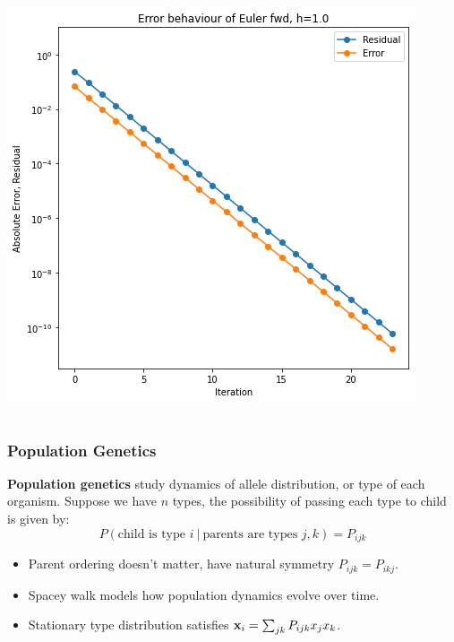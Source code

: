 \documentclass{beamer}
\begin{document}
\begin{frame}
\begin{columns}
    \begin{column}{0.5\linewidth}
      \includegraphics[width=\linewidth]{images/euler.png}
    \end{column}
  \end{columns}
\end{frame}


\begin{frame}
  \frametitle{Population Genetics}
  \textbf{Population genetics} study dynamics of allele distribution, or type of each organism.  Suppose we have $n$ types, the possibility of passing each type to child is given by:
  \[ P\left(\text{child is type } i \:|\: \text{parents are types } j, k\right) = P_{ijk} \]
  \begin{itemize}
  	\item Parent ordering doesn't matter, have natural symmetry $P_{ijk}=P_{ikj}$.
  	\item Spacey walk models how population dynamics evolve over time.
  	\item Stationary type distribution satisfies ${\bf x}_i = \sum_{jk}P_{ijk}x_jx_k$.
  \end{itemize}

\end{frame}
\end{document}
